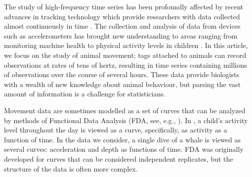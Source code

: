 



The study of high-frequency time series has been profoundly affected by recent advances in tracking technology which provide researchers with data collected almost continuously in time \cite{Hooten:2017}.
The collection and analysis of data from devices such as accelerometers has brought new understanding to areas ranging from monitoring machine health \citep{Getman:2009} to physical activity levels in children \citep{Morris:2007}.
In this article, we focus on the study of animal movement; tags attached to animals can record observations at rates of tens of hertz, resulting in time series containing millions of observations over the course of several hours. These data provide biologists with a wealth of new knowledge about animal behaviour, but parsing the vast amount of information is a challenge for statisticians.


Movement data are sometimes modelled as a set of curves that can  be analyzed by methods of Functional Data Analysis (FDA, see, e.g., \citealt{Ramsay:2005}).  In \cite{Morris:2007}, a child's activity level throughout the day is viewed as a curve, specifically, as activity as a function of time.   
In the data  we consider, a single dive of a whale is viewed as several curves:  acceleration and depth as  functions of time.
FDA was originally developed for curves that can be considered independent replicates, but the structure of the data is often more complex.


